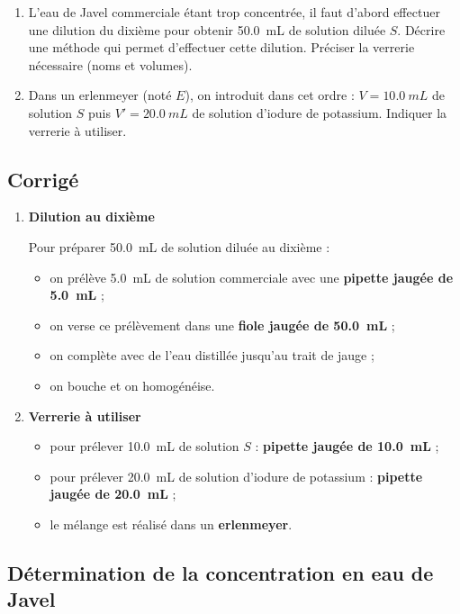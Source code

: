 \documentclass[a4paper,fontsize=11pt,fleqn]{scrartcl}
\begin{document}
\begin{enumerate}
    \item L'eau de Javel commerciale étant trop concentrée, il faut d'abord effectuer une dilution du dixième pour obtenir \SI{50,0}{mL} de solution diluée $S$. Décrire une méthode qui permet d'effectuer cette dilution. Préciser la verrerie nécessaire (noms et volumes).
    \item Dans un erlenmeyer (noté $E$), on introduit dans cet ordre : $V = \SI{10,0}{mL}$ de solution $S$ puis $V' = \SI{20,0}{mL}$ de solution d'iodure de potassium. Indiquer la verrerie à utiliser.
\end{enumerate}

\subsection*{Corrigé}

\begin{enumerate}
    \item \textbf{Dilution au dixième}

    Pour préparer \SI{50,0}{mL} de solution diluée au dixième :
    \begin{itemize}
        \item on prélève \SI{5,0}{mL} de solution commerciale avec une \textbf{pipette jaugée de \SI{5,0}{mL}} ;
        \item on verse ce prélèvement dans une \textbf{fiole jaugée de \SI{50,0}{mL}} ;
        \item on complète avec de l'eau distillée jusqu'au trait de jauge ;
        \item on bouche et on homogénéise.
    \end{itemize}

    \item \textbf{Verrerie à utiliser}

    \begin{itemize}
        \item pour prélever \SI{10,0}{mL} de solution $S$ : \textbf{pipette jaugée de \SI{10,0}{mL}} ;
        \item pour prélever \SI{20,0}{mL} de solution d'iodure de potassium : \textbf{pipette jaugée de \SI{20,0}{mL}} ;
        \item le mélange est réalisé dans un \textbf{erlenmeyer}.
    \end{itemize}
\end{enumerate}

\subsection{Détermination de la concentration en eau de Javel}
\end{document}
